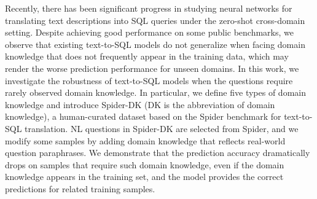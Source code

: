 Recently, there has been significant progress in studying neural networks for translating text descriptions into SQL queries under the zero-shot cross-domain setting. Despite achieving good performance on some public benchmarks, we observe that existing text-to-SQL models do not generalize when facing domain knowledge that does not frequently appear in the training data, which may render the worse prediction performance for unseen domains. In this work, we investigate the robustness of text-to-SQL models when the questions require rarely observed domain knowledge. In particular, we define five types of domain knowledge and introduce Spider-DK (DK is the abbreviation of domain knowledge), a human-curated dataset based on the Spider benchmark for text-to-SQL translation. NL questions in Spider-DK are selected from Spider, and we modify some samples by adding domain knowledge that reflects real-world question paraphrases. We demonstrate that the prediction accuracy dramatically drops on samples that require such domain knowledge, even if the domain knowledge appears in the training set, and the model provides the correct predictions for related training samples.
